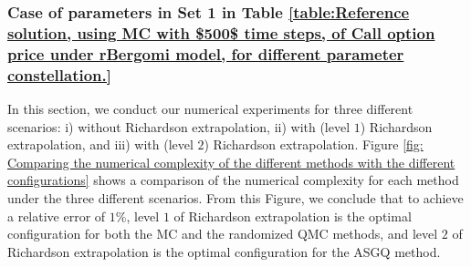 \subsubsection{Case of parameters in Set 1 in Table \ref{table:Reference solution, using MC with $500$ time steps, of Call option price under rBergomi model, for different parameter constellation.} }
\label{sec:Case of set $2$ parameters_linear}
In this section, we conduct our numerical experiments for three different scenarios: i) without Richardson extrapolation, ii) with (level $1$) Richardson extrapolation, and iii) with (level $2$) Richardson extrapolation. Figure \ref{fig: Comparing the numerical complexity of the different  methods with the different configurations}  shows a comparison of the numerical complexity for each method under the three different scenarios. From this Figure, we conclude that to achieve a relative error of $1\%$, level $1$ of Richardson extrapolation is the optimal configuration for both the MC and the randomized QMC methods, and level $2$ of Richardson extrapolation is the optimal configuration for the ASGQ  method.


